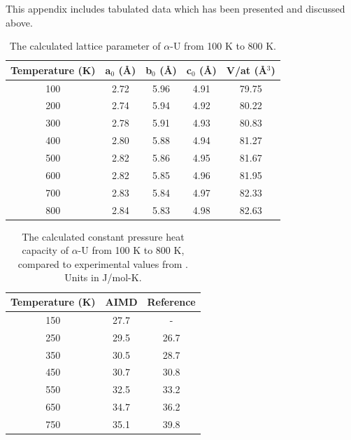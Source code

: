 \documentclass[utf8]{frontiersSCNS} %
\begin{document}
This appendix includes tabulated data which has been presented and discussed above. 

\setcounter{table}{0}
\renewcommand{\thetable}{A\arabic{table}}

\begin{table}[h]
\caption{The calculated lattice parameter of $\alpha$-U from 100 K to 800 K.} \label{tab:lat}
\begin{center}
\begin{tabular}{|c|c|c|c|c|}
	\hline
	Temperature (K) & a$_0$ (\AA) & b$_0$ (\AA) & c$_0$ (\AA) & V/at (\AA$^3$) \\
	 \hline
100 &	2.72	& 5.96	& 4.91 &	79.75 \\
200 &	2.74 &	5.94 &	4.92 &	80.22  \\
300 &	2.78	& 5.91 &	4.93	& 80.83 \\
400 &	2.80 &	5.88 &	4.94	& 81.27 \\
500 &	2.82 &	5.86 &	4.95	& 81.67 \\
600 &	2.82 &	5.85 &	4.96	& 81.95 \\
700 &	2.83 &	5.84 &	4.97	 & 82.33 \\
800 &	2.84 &	5.83 &	4.98	& 82.63 \\
	 \hline
\end{tabular}
\end{center}
\label{default}
\end{table}

\begin{table}[h]
\caption{The calculated constant pressure heat capacity of $\alpha$-U from 100 K to 800 K, compared to experimental values from \cite{konings2010}. Units in J/mol-K.} \label{tab:cp}
\begin{center}
\begin{tabular}{|c|c|c|}
	\hline
	Temperature (K) & AIMD & Reference \\
	 \hline
150 &	27.7	& -	 \\
250 &	29.5 & 26.7  \\
350 &	30.5	& 28.7 \\
450 &	30.7 & 30.8  \\
550 &	32.5 & 33.2  \\
650 &	34.7 & 36.2  \\
750 &	35.1 & 39.8  \\
	 \hline
\end{tabular}
\end{center}
\label{default}
\end{table}
\end{document}
